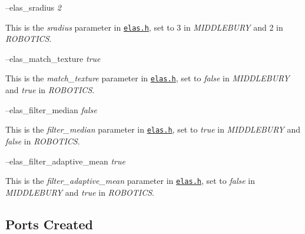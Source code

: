 --elas\+\_\+sradius {\itshape 2} 
\begin{DoxyItemize}
\item This is the {\itshape sradius} parameter in \href{https://github.com/robotology/stereo-vision/tree/master/lib/elas/include/elas.h}{\tt elas.\+h}, set to 3 in {\itshape M\+I\+D\+D\+L\+E\+B\+U\+RY} and 2 in {\itshape R\+O\+B\+O\+T\+I\+CS}.
\end{DoxyItemize}

--elas\+\_\+match\+\_\+texture {\itshape true} 
\begin{DoxyItemize}
\item This is the {\itshape match\+\_\+texture} parameter in \href{https://github.com/robotology/stereo-vision/tree/master/lib/elas/include/elas.h}{\tt elas.\+h}, set to {\itshape false} in {\itshape M\+I\+D\+D\+L\+E\+B\+U\+RY} and {\itshape true} in {\itshape R\+O\+B\+O\+T\+I\+CS}.
\end{DoxyItemize}

--elas\+\_\+filter\+\_\+median {\itshape false} 
\begin{DoxyItemize}
\item This is the {\itshape filter\+\_\+median} parameter in \href{https://github.com/robotology/stereo-vision/tree/master/lib/elas/include/elas.h}{\tt elas.\+h}, set to {\itshape true} in {\itshape M\+I\+D\+D\+L\+E\+B\+U\+RY} and {\itshape false} in {\itshape R\+O\+B\+O\+T\+I\+CS}.
\end{DoxyItemize}

--elas\+\_\+filter\+\_\+adaptive\+\_\+mean {\itshape true} 
\begin{DoxyItemize}
\item This is the {\itshape filter\+\_\+adaptive\+\_\+mean} parameter in \href{https://github.com/robotology/stereo-vision/tree/master/lib/elas/include/elas.h}{\tt elas.\+h}, set to {\itshape false} in {\itshape M\+I\+D\+D\+L\+E\+B\+U\+RY} and {\itshape true} in {\itshape R\+O\+B\+O\+T\+I\+CS}.
\end{DoxyItemize}\hypertarget{group__SFM_portsc_sec}{}\subsection{Ports Created}\label{group__SFM_portsc_sec}

